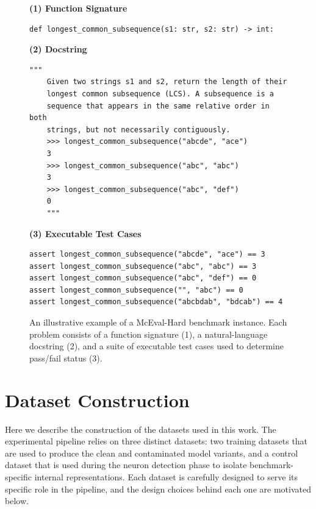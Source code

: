 \documentclass[mscthesis]{usiinfthesis}
\begin{document}
\begin{figure}[ht]
\centering
\begin{tcolorbox}[
    width=0.85\textwidth,
    colback=gray!6,
    colframe=gray!50,
    arc=3pt,
    boxrule=0.5pt,
    title={\small\textbf{McEval-Hard --- Example Benchmark Instance}},
    fonttitle=\bfseries,
    left=6pt, right=6pt, top=4pt, bottom=4pt
]
\textbf{(1) Function Signature}
\begin{lstlisting}[style=pythonstyle]
def longest_common_subsequence(s1: str, s2: str) -> int:
\end{lstlisting}
\vspace{4pt}
\textbf{(2) Docstring}
\begin{lstlisting}[style=pythonstyle]
    """
    Given two strings s1 and s2, return the length of their
    longest common subsequence (LCS). A subsequence is a
    sequence that appears in the same relative order in both
    strings, but not necessarily contiguously.
    >>> longest_common_subsequence("abcde", "ace")
    3
    >>> longest_common_subsequence("abc", "abc")
    3
    >>> longest_common_subsequence("abc", "def")
    0
    """
\end{lstlisting}
\vspace{4pt}
\textbf{(3) Executable Test Cases}
\begin{lstlisting}[style=pythonstyle]
assert longest_common_subsequence("abcde", "ace") == 3
assert longest_common_subsequence("abc", "abc") == 3
assert longest_common_subsequence("abc", "def") == 0
assert longest_common_subsequence("", "abc") == 0
assert longest_common_subsequence("abcbdab", "bdcab") == 4
\end{lstlisting}
\end{tcolorbox}
\caption{An illustrative example of a McEval-Hard benchmark instance. Each problem
consists of a function signature (1), a natural-language docstring (2), and a suite
of executable test cases used to determine pass/fail status (3).}
\label{fig:mceval_example}
\end{figure}

\section{Dataset Construction}
\label{sec:datasets}
Here we describe the construction of the datasets used in this work. The experimental pipeline relies on three distinct datasets: two training datasets that are used to produce the clean and contaminated model variants, and a control dataset that is used during the neuron detection phase to isolate benchmark-specific internal representations. Each dataset is carefully designed to serve its specific role in the pipeline, and the design choices behind each one are motivated below.
 
\end{document}
